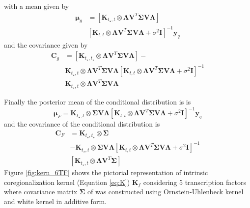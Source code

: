 with a mean given by
\begin{equation} \label{eq:prediction_MuG}
\begin{split}
\boldsymbol{\mu}_g &= 
\left[ \mathbf{K}_{t_\star,t} \otimes \boldsymbol{\Lambda} \mathbf{V}^T\boldsymbol{\Sigma} \mathbf{V} \boldsymbol{\Lambda}  \right] \\
&\left[ \mathbf{K}_{t,t} \otimes \boldsymbol{\Lambda} \mathbf{V}^T\boldsymbol{\Sigma} \mathbf{V} \boldsymbol{\Lambda} + \sigma^2 \mathbf{I} \right]^{-1}\mathbf{y}_q
\end{split}
\end{equation}
and the covariance given by
\begin{equation} \label{eq:prediction_Cg}
\begin{split}
\boldsymbol{C}_g &= 
\left[ \mathbf{K}_{t_\star,t_\star} \otimes \boldsymbol{\Lambda} \mathbf{V}^T\boldsymbol{\Sigma} \mathbf{V} \boldsymbol{\Lambda}  \right] - \\
&\mathbf{K}_{t_\star,t} \otimes \boldsymbol{\Lambda} \mathbf{V}^T\boldsymbol{\Sigma} \mathbf{V} \boldsymbol{\Lambda}  
\left[ \mathbf{K}_{t,t} \otimes \boldsymbol{\Lambda} \mathbf{V}^T\boldsymbol{\Sigma} \mathbf{V} \boldsymbol{\Lambda} + \sigma^2 \mathbf{I} \right]^{-1} \\
&\mathbf{K}_{t_\star,t} \otimes \boldsymbol{\Lambda} \mathbf{V}^T\boldsymbol{\Sigma} \mathbf{V} \boldsymbol{\Lambda} 
\end{split}
\end{equation}

Finally the posterior mean of the conditional distribution  is %
is
\begin{equation} \label{eq:prediction_MuF}
\boldsymbol{\mu}_F = 
\mathbf{K}_{t_\star,t} \otimes \boldsymbol{\Sigma} \mathbf{V} \boldsymbol{\Lambda}
\left[ \mathbf{K}_{t,t} \otimes \boldsymbol{\Lambda} \mathbf{V}^T\boldsymbol{\Sigma} \mathbf{V} \boldsymbol{\Lambda} + \sigma^2 \mathbf{I} \right]^{-1}\mathbf{y}_q
\end{equation}
and the covariance of the conditional distribution is %
\begin{equation} \label{eq:prediction_CF}
\begin{split}
\boldsymbol{C}_F &= 
\mathbf{K}_{t_\star,t_\star} \otimes \boldsymbol{\Sigma} \\
& - \mathbf{K}_{t_\star,t} \otimes \boldsymbol{\Sigma}\mathbf{V} \boldsymbol{\Lambda}
\left[ \mathbf{K}_{t,t} \otimes \boldsymbol{\Lambda} \mathbf{V}^T\boldsymbol{\Sigma} \mathbf{V} \boldsymbol{\Lambda} + \sigma^2 \mathbf{I} \right]^{-1} \\
& \left[ \mathbf{K}_{t_\star,t} \otimes \boldsymbol{\Lambda} \mathbf{V}^T\boldsymbol{\Sigma}\right]
\end{split}
\end{equation}
Figure \ref{fig:kern_6TF} shows the pictorial representation of intrinsic coregionalization kernel (Equation \ref{eq:K}) $\textbf{K}_f$ considering 5 transcription factors where covariance matrix $\boldsymbol{\Sigma}$ of  was constructed using Ornstein-Uhlenbeck kernel and white kernel in additive form.

